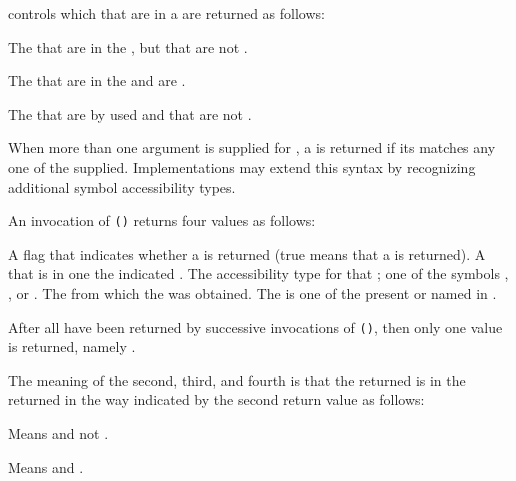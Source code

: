  controls which  that are 
in a  are returned as follows:

\beginlist
{}

  The  that are  in the ,
  but that are not .


  The  that are  in the 
  and are .


  The  that are  by used 
  and that are not .
\endlist

When more than one argument is supplied for , 
a  is returned if its  matches 
any one of the  supplied.  
Implementations may extend this syntax by recognizing additional 
symbol accessibility types.
 
An invocation of {\tt ()} returns four values as follows:

\beginlist
{} A flag that indicates whether a  is returned
	      (true means that a  is returned).
 A  that is  in one the
	      indicated .
 The accessibility type for that ; 
	      \ie one of the symbols , , or .
 The  from which the  was obtained.
	      The  is one of the  present 
	      or named in .
\endlist

After all  have been returned by successive invocations of
{\tt ()}, then only one value is returned, namely \nil.
 
The meaning of the second, third, and fourth  is that the returned 
 is  in the returned 
in the way indicated by the second return value as follows:

\beginlist
{}

Means  and not .


Means  and .


